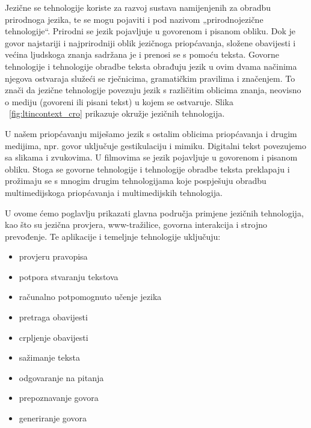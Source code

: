 \clearpage



\begin{multicols}{2}

Jezične se tehnologije koriste za razvoj sustava namijenjenih za obradbu prirodnoga jezika, te se mogu pojaviti i pod nazivom „prirodnojezične tehnologije“. Prirodni se jezik pojavljuje u govorenom i pisanom obliku. Dok je govor najstariji i najprirodniji oblik jezičnoga priopćavanja, složene obavijesti i većina ljudskoga znanja sadržana je i prenosi se s pomoću teksta. Govorne tehnologije i tehnologije obradbe teksta obrađuju jezik u ovim dvama načinima njegova ostvaraja služeći se rječnicima, gramatičkim pravilima i značenjem. To znači da jezične tehnologije povezuju jezik s različitim oblicima znanja, neovisno o mediju (govoreni ili pisani tekst) u kojem se ostvaruje. Slika ~\ref{fig:ltincontext_cro} prikazuje okružje jezičnih tehnologija.

U našem priopćavanju miješamo jezik s ostalim oblicima priopćavanja i drugim medijima, npr. govor uključuje gestikulaciju i mimiku. Digitalni tekst povezujemo sa slikama i zvukovima. U filmovima se jezik pojavljuje u govorenom i pisanom obliku. Stoga se govorne tehnologije i tehnologije obradbe teksta preklapaju i prožimaju se s mnogim drugim tehnologijama koje pospješuju obradbu multimedijskoga priopćavanja i multimedijskih tehnologija.

U ovome ćemo poglavlju prikazati glavna područja primjene jezičnih tehnologija, kao što su jezična provjera, www-tražilice, govorna interakcija i strojno prevođenje. Te aplikacije i temeljnje tehnologije uključuju:
\begin{itemize}
\item provjeru pravopisa
\item potpora stvaranju tekstova
\item računalno potpomognuto učenje jezika
\item pretraga obavijesti
\item crpljenje obavijesti
\item sažimanje teksta
\item odgovaranje na pitanja
\item prepoznavanje govora
\item generiranje govora
\end{itemize}


\end{multicols}
